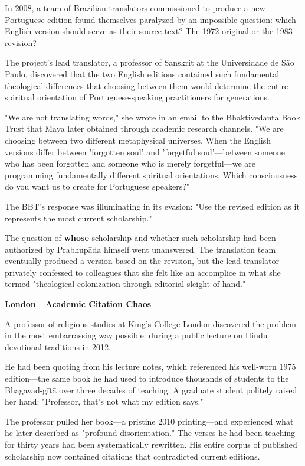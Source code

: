 \documentclass[12pt,twoside]{book}
\begin{document}
In 2008, a team of Brazilian translators commissioned to produce a new Portuguese edition found themselves paralyzed by an impossible question: which English version should serve as their source text? The 1972 original or the 1983 revision?

The project's lead translator, a professor of Sanskrit at the Universidade de São Paulo, discovered that the two English editions contained such fundamental theological differences that choosing between them would determine the entire spiritual orientation of Portuguese-speaking practitioners for generations.

"We are not translating words," she wrote in an email to the Bhaktivedanta Book Trust that Maya later obtained through academic research channels. "We are choosing between two different metaphysical universes. When the English versions differ between 'forgotten soul' and 'forgetful soul'—between someone who has been forgotten and someone who is merely forgetful—we are programming fundamentally different spiritual orientations. Which consciousness do you want us to create for Portuguese speakers?"

The BBT's response was illuminating in its evasion: "Use the revised edition as it represents the most current scholarship."

The question of \textbf{whose} scholarship and whether such scholarship had been authorized by Prabhupāda himself went unanswered. The translation team eventually produced a version based on the revision, but the lead translator privately confessed to colleagues that she felt like an accomplice in what she termed "theological colonization through editorial sleight of hand."

\textbf{\textbf{London—Academic Citation Chaos}}

A professor of religious studies at King's College London discovered the problem in the most embarrassing way possible: during a public lecture on Hindu devotional traditions in 2012.

He had been quoting from his lecture notes, which referenced his well-worn 1975 edition—the same book he had used to introduce thousands of students to the Bhagavad-gītā over three decades of teaching. A graduate student politely raised her hand: "Professor, that's not what my edition says."

The professor pulled her book—a pristine 2010 printing—and experienced what he later described as "profound disorientation." The verses he had been teaching for thirty years had been systematically rewritten. His entire corpus of published scholarship now contained citations that contradicted current editions.
\end{document}
